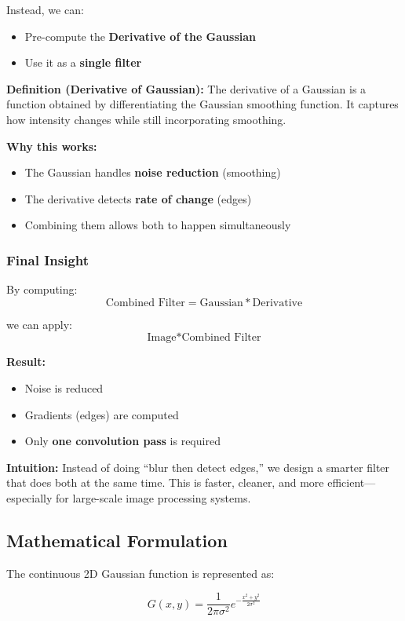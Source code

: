 \documentclass[12pt]{article}
\begin{document}
Instead, we can:
\begin{itemize}
    \item Pre-compute the \textbf{Derivative of the Gaussian}
    \item Use it as a \textbf{single filter}
\end{itemize}

\textbf{Definition (Derivative of Gaussian):}
The derivative of a Gaussian is a function obtained by differentiating the Gaussian smoothing function. It captures how intensity changes while still incorporating smoothing.

\textbf{Why this works:}
\begin{itemize}
    \item The Gaussian handles \textbf{noise reduction} (smoothing)
    \item The derivative detects \textbf{rate of change} (edges)
    \item Combining them allows both to happen simultaneously
\end{itemize}

\subsubsection{Final Insight}

By computing:
\[
    \text{Combined Filter} = \text{Gaussian} * \text{Derivative}
\]

we can apply:
\[
    \text{Image} * \text{Combined Filter}
\]

\textbf{Result:}
\begin{itemize}
    \item Noise is reduced
    \item Gradients (edges) are computed
    \item Only \textbf{one convolution pass} is required
\end{itemize}

\textbf{Intuition:}
Instead of doing ``blur then detect edges,'' we design a smarter filter that does both at the same time. This is faster, cleaner, and more efficient—especially for large-scale image processing systems.

\subsection{Mathematical Formulation}

The continuous 2D Gaussian function is represented as:

\[
    G(x,y)=\frac{1}{2\pi\sigma^2} e^{-\frac{x^2+y^2}{2\sigma^2}}
\]
\end{document}
